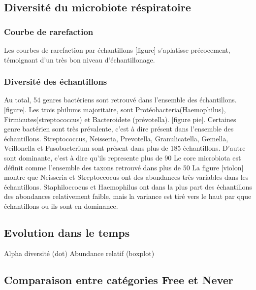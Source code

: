 \documentclass[12pt,a4paper]{article}
\begin{document}
\subsection{Diversité du microbiote réspiratoire}

\subsubsection{Courbe de rarefaction}

Les courbes de rarefaction par échantillons [figure] s’aplatisse précocement, témoignant d’un très bon niveau d’échantillonage.

\subsubsection{Diversité des échantillons}

Au total, 54 genres bactériens sont retrouvé dans l’ensemble des échantillons. [figure].
Les trois philums majoritaire, sont Protéobacteria(Haemophilus), Firmicutes(streptococcus) et Bacteroidete (prévotella). [figure pie].
Certaines genre bactérien sont très prévalente, c’est à dire présent dans l’ensemble des échantillons. Streptococcus, Neisseria, Prevotella, Granulicatella, Gemella, Veillonella et Fusobacterium sont présent dans plus de 185 échantillons.
D’autre sont dominante, c’est à dire qu’ils represente plus de 90%
Le core microbiota est définit comme l’ensemble des taxons retrouvé dans plus de 50%
La figure [violon] montre que Neisseria et Streptoccocus ont des abondances très variables dans les échantillons. Staphiloccocus et Haemophilus ont dans la plus part des échantillons des abondances relativement faible, mais la variance est tiré vers le haut par qque échantillons ou ils sont en dominance.

\subsection{Evolution dans le temps}
Alpha diversité (dot)
Abundance relatif (boxplot)

\subsection{Comparaison entre catégories Free et Never}
\end{document}
